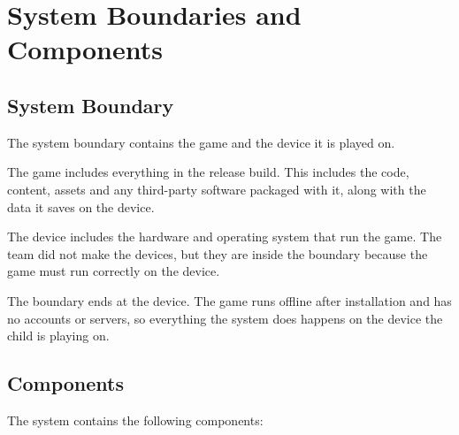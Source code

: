 \documentclass{article}
\begin{document}
\section{System Boundaries and Components}

\subsection{System Boundary}

The system boundary contains the game and the device it is played on.

The game includes everything in the release build. This includes the code, content,
assets and any third-party software packaged with it, along with the data it saves
on the device.

The device includes the hardware and operating system that run
the game. The team did not make the devices, but they are inside the boundary
because the game must run correctly on the device.

The boundary ends at the device. The game runs offline after installation and
has no accounts or servers, so everything the system does happens on the
device the child is playing on.

\subsection{Components}

The system contains the following components:
\end{document}
